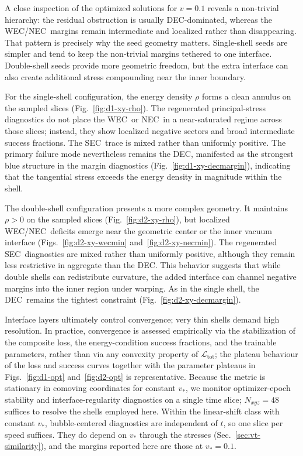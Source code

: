 \documentclass[11pt]{article}
\makeatletter
\newcommand{\@abbr}[1]{\ifmmode\mathrm{#1}\else\textsc{#1}\fi}
\newcommand{\WEC}{\@abbr{WEC}}
\newcommand{\NEC}{\@abbr{NEC}}
\newcommand{\SEC}{\@abbr{SEC}}
\newcommand{\DEC}{\@abbr{DEC}}
\makeatother
\begin{document}
A close inspection of the optimized solutions for $v=0.1$ reveals a non-trivial hierarchy: the residual obstruction is usually \DEC-dominated, whereas the \WEC/\NEC\ margins remain intermediate and localized rather than disappearing. That pattern is precisely why the seed geometry matters. Single-shell seeds are simpler and tend to keep the non-trivial margins tethered to one interface. Double-shell seeds provide more geometric freedom, but the extra interface can also create additional stress compounding near the inner boundary.

For the single-shell configuration, the energy density $\rho$ forms a clean annulus on the sampled slices (Fig.~\ref{fig:d1-xy-rho}). The regenerated principal-stress diagnostics do not place the \WEC\ or \NEC\ in a near-saturated regime across those slices; instead, they show localized negative sectors and broad intermediate success fractions. The \SEC\ trace is mixed rather than uniformly positive. The primary failure mode nevertheless remains the \DEC, manifested as the strongest blue structure in the margin diagnostics (Fig.~\ref{fig:d1-xy-decmargin}), indicating that the tangential stress exceeds the energy density in magnitude within the shell.

The double-shell configuration presents a more complex geometry. It maintains $\rho>0$ on the sampled slices (Fig.~\ref{fig:d2-xy-rho}), but localized \WEC/\NEC\ deficits emerge near the geometric center or the inner vacuum interface (Figs.~\ref{fig:d2-xy-wecmin} and~\ref{fig:d2-xy-necmin}). The regenerated \SEC\ diagnostics are mixed rather than uniformly positive, although they remain less restrictive in aggregate than the \DEC. This behavior suggests that while double shells can redistribute curvature, the added interface can channel negative margins into the inner region under warping. As in the single shell, the \DEC\ remains the tightest constraint (Fig.~\ref{fig:d2-xy-decmargin}).

Interface layers ultimately control convergence; very thin shells demand high resolution. In practice, convergence is assessed empirically via the stabilization of the composite loss, the energy-condition success fractions, and the trainable parameters, rather than via any convexity property of $\mathcal{L}_\text{tot}$; the plateau behaviour of the loss and success curves together with the parameter plateaus in Figs.~\ref{fig:d1-opt} and~\ref{fig:d2-opt} is representative. Because the metric is stationary in comoving coordinates for constant $v_*$, we monitor optimizer-epoch stability and interface-regularity diagnostics on a single time slice; $N_{xyz}=48$ suffices to resolve the shells employed here. Within the linear-shift class with constant $v_*$, bubble-centered diagnostics are independent of $t$, so one slice per speed suffices. They do depend on $v_*$ through the stresses (Sec.~\ref{sec:vt-similarity}), and the margins reported here are those at $v_*=0.1$.
\end{document}
